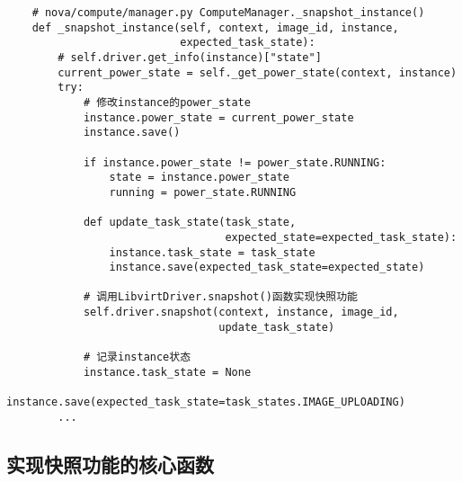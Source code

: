 \documentclass[a4paper,left=1.5cm,right=1.5cm,11pt]{article}
\begin{document}
    \begin{lstlisting}
    # nova/compute/manager.py ComputeManager._snapshot_instance()
    def _snapshot_instance(self, context, image_id, instance,
                           expected_task_state):
        # self.driver.get_info(instance)["state"]
        current_power_state = self._get_power_state(context, instance)
        try:
            # 修改instance的power_state
            instance.power_state = current_power_state
            instance.save()

            if instance.power_state != power_state.RUNNING:
                state = instance.power_state
                running = power_state.RUNNING

            def update_task_state(task_state,
                                  expected_state=expected_task_state):
                instance.task_state = task_state
                instance.save(expected_task_state=expected_state)

            # 调用LibvirtDriver.snapshot()函数实现快照功能
            self.driver.snapshot(context, instance, image_id,
                                 update_task_state)
            
            # 记录instance状态
            instance.task_state = None
            instance.save(expected_task_state=task_states.IMAGE_UPLOADING)
        ...
    \end{lstlisting}

\subsection{实现快照功能的核心函数}
\end{document}
